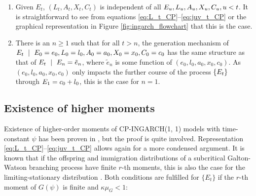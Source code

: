\documentclass{article}
\begin{document}
\begin{enumerate}
\item Given $E_t$, $(L_t, A_t, X_t, C_t)$ is independent of all $E_u, L_u, A_u, X_u, C_u, u < t$. It is straightforward to see from equations \eqref{eq:L_t_CP}--\eqref{eq:juv_t_CP} or the graphical representation in Figure \ref{fig:ingarch_flowchart} that this is the case.
\item There is an $n \geq 1$ such that for all $t > n$, the generation mechanism of $\juv_t \ \mid \ \juv_0 = e_0, L_0 = l_0, A_0 = a_0, X_0 = x_0, C_0 = c_0$ has the same structure as that of $\juv_t \ \mid \ \juv_n = \tilde{e}_n$, where $\tilde{e}_n$ is some function of $(e_0, l_0, a_0, x_0, c_0)$. As $(e_0, l_0, a_0, x_0, c_0)$ only impacts the further course of the process $\{E_t\}$ through $E_1 = c_0 + l_0$, this is the case for $n = 1$. %
\end{enumerate}

\subsection{Existence of higher moments}

Existence of higher-order moments of CP-INGARCH(1, 1) models with time-constant $\psi$ has been proven in \cite{Silva2016}, but the proof is quite involved. Representation \eqref{eq:L_t_CP}--\eqref{eq:juv_t_CP} allows again for a more condensed argument. It is known that if the offspring and immigration distributions of a subcritical Galton-Watson branching process have finite $r$-th moments, this is also the case for the limiting-stationary distribution \cite[Sec. 4]{Lange1981}. Both conditions are fulfilled for $\{E_t\}$ if the $r$-th moment of $G(\psi)$ is finite and $\kappa\mu_G < 1$:
\end{document}
